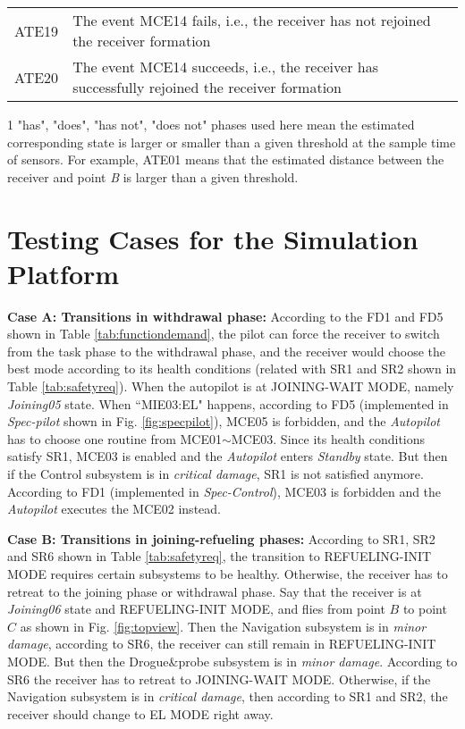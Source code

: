 \begin{table}
\begin{threeparttable}
\begin{tabular}{cp{15cm}}
			ATE19 & The event MCE14 fails, i.e., the receiver has not rejoined the receiver formation \\ 
			ATE20 & The event MCE14 succeeds, i.e., the receiver has successfully rejoined the receiver formation \\ 
			\hline \hline
		\end{tabular}
		\begin{tablenotes}\footnotesize
			\item[1] "has",  "does", "has not", "does not" phases used here mean the estimated corresponding state is larger or smaller than a given threshold at the sample time of sensors. For example, ATE01 means that the estimated distance between the receiver and point \textit{B} is larger than a given threshold.
		\end{tablenotes}
	\end{threeparttable}
\end{table}	



\section{Testing Cases for the Simulation Platform}
\label{app:test}

\textbf{Case A: Transitions in withdrawal phase:}
According to the FD1 and FD5 shown in Table \ref{tab:functiondemand}, the pilot can force the receiver to switch from the task phase to the withdrawal phase, and the receiver would choose the best mode according to its health conditions (related with SR1 and SR2 shown in Table \ref{tab:safetyreq}). When the autopilot is at JOINING-WAIT MODE, namely \textit{Joining05} state. When ``MIE03:EL" happens, according to FD5 (implemented in \textit{Spec-pilot} shown in Fig. \ref{fig:specpilot}), MCE05 is forbidden, and the \textit{Autopilot} has to choose one routine from MCE01$ \sim $MCE03. Since its health conditions satisfy SR1, MCE03 is enabled and the \textit{Autopilot} enters \textit{Standby} state. But then if the Control subsystem is in \textit{critical damage}, SR1 is not satisfied anymore. According to FD1 (implemented in \textit{Spec-Control}), MCE03 is forbidden and the \textit{Autopilot} executes the MCE02 instead.

\textbf{Case B: Transitions in joining-refueling phases:} According to SR1, SR2 and SR6 shown in Table \ref{tab:safetyreq}, the transition to REFUELING-INIT MODE requires certain subsystems to be healthy. Otherwise, the receiver has to retreat to the joining phase or withdrawal phase. Say that the receiver is at \textit{Joining06} state and REFUELING-INIT MODE, and flies from point $ B $ to point $ C $ as shown in Fig. \ref{fig:topview}. Then the Navigation subsystem is in \textit{minor damage}, according to SR6, the receiver can still remain in REFUELING-INIT MODE. But then the Drogue\&probe subsystem is in \textit{minor damage}. According to SR6 the receiver has to retreat to JOINING-WAIT MODE. Otherwise, if the Navigation subsystem is in \textit{critical damage}, then according to SR1 and SR2, the receiver should change to EL MODE right away.

